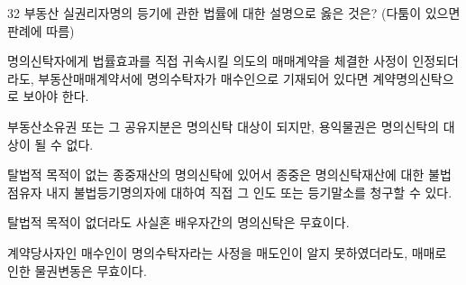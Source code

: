 \begin{question}{32}
부동산 실권리자명의 등기에 관한 법률에 대한 설명으로 옳은 것은? (다툼이 있으면 판례에 따름)
\begin{choices}
  \item 명의신탁자에게 법률효과를 직접 귀속시킬 의도의 매매계약을 체결한 사정이 인정되더라도, 부동산매매계약서에 명의수탁자가 매수인으로 기재되어 있다면 계약명의신탁으로 보아야 한다.
  \item 부동산소유권 또는 그 공유지분은 명의신탁 대상이 되지만, 용익물권은 명의신탁의 대상이 될 수 없다.
  \item 탈법적 목적이 없는 종중재산의 명의신탁에 있어서 종중은 명의신탁재산에 대한 불법점유자 내지 불법등기명의자에 대하여 직접 그 인도 또는 등기말소를 청구할 수 있다.
  \item 탈법적 목적이 없더라도 사실혼 배우자간의 명의신탁은 무효이다.
  \item 계약당사자인 매수인이 명의수탁자라는 사정을 매도인이 알지 못하였더라도, 매매로 인한 물권변동은 무효이다.
\end{choices}
\end{question}
